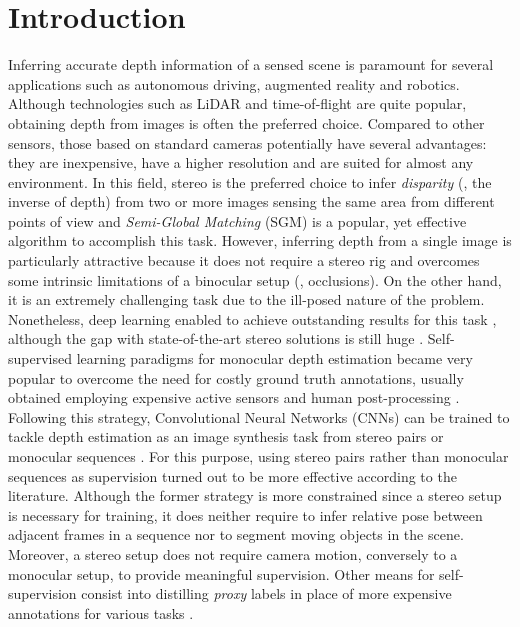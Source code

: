 \documentclass[10pt,twocolumn,letterpaper]{article}
\begin{document}
\section{Introduction}
Inferring accurate depth information of a sensed scene is paramount for several applications such as autonomous driving, augmented reality and robotics.  Although technologies such as LiDAR and time-of-flight are quite popular, obtaining depth from images is often the preferred choice. Compared to other sensors, those based on standard cameras potentially have several advantages: they are inexpensive, have a higher resolution and are suited for almost any environment. In this field, stereo is the preferred choice to infer \textit{disparity} (\ie, the inverse of depth) from two or more images sensing the same area from different points of view and \textit{Semi-Global Matching} (SGM) \cite{hirschmuller2005accurate} is a popular, yet effective algorithm to accomplish this task. However, inferring depth from a single image is particularly attractive because it does not require a stereo rig and overcomes some intrinsic limitations of a binocular setup (\eg, occlusions). On the other hand, it is an extremely challenging task due to the ill-posed nature of the problem. Nonetheless, deep learning enabled to achieve outstanding results for this task \cite{fu2018supervised}, although the gap with state-of-the-art stereo solutions is still huge \cite{Chang_2018_CVPR,liang2018learning}.
Self-supervised learning paradigms for monocular depth estimation \cite{monodepth17, zhou2017unsupervised, mahjourian2018unsupervised, 3net18, pydnet18, yang2018deep} became very popular to overcome the need for costly ground truth annotations, usually obtained employing expensive active sensors and human post-processing \cite{KITTI_2012,KITTI_2015,Uhrig2017THREEDV}. Following this strategy, Convolutional Neural Networks (CNNs) can be trained to tackle depth estimation as an image synthesis task from stereo pairs or monocular sequences \cite{monodepth17,zhou2017unsupervised}. For this purpose, using stereo pairs rather than monocular sequences as supervision turned out to be more effective according to the literature. Although the former strategy is more constrained since a stereo setup is necessary for training, it does neither require to infer relative pose between adjacent frames in a sequence nor to segment moving objects in the scene. Moreover, a stereo setup does not require camera motion, conversely to a monocular setup, to provide meaningful supervision. 
Other means for self-supervision consist into distilling \emph{proxy} labels in place of more expensive annotations for various tasks \cite{Tonioni_2017_ICCV,Tosi_2017_BMVC,DDFlow,makansi2018fusionnet,Klodt_2018_ECCV,guo2018learning}.
\end{document}
